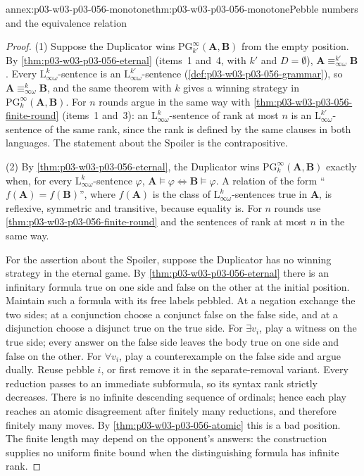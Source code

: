 \begin{annexitem}{annex:p03-w03-p03-056-monotone}{thm:p03-w03-p03-056-monotone}{Pebble numbers and the equivalence relation}
\begin{proof}
(1) Suppose the Duplicator wins \(\mathrm{PG}^\infty_{k'}(\mathbf A,\mathbf B)\)
from the empty position. By \cref{thm:p03-w03-p03-056-eternal} (items~1
and~4, with \(k'\) and \(D=\emptyset\)),
\(\mathbf A\equiv^{k'}_{\infty\omega}\mathbf B\). Every
\(\mathrm{L}^k_{\infty\omega}\)-sentence is an
\(\mathrm{L}^{k'}_{\infty\omega}\)-sentence
(\cref{def:p03-w03-p03-056-grammar}), so
\(\mathbf A\equiv^k_{\infty\omega}\mathbf B\), and the same theorem with
\(k\) gives a winning strategy in \(\mathrm{PG}^\infty_k(\mathbf A,\mathbf B)\).
For \(n\) rounds argue in the same way with
\cref{thm:p03-w03-p03-056-finite-round} (items~1 and~3): an
\(\mathrm{L}^k_{\infty\omega}\)-sentence of rank at most \(n\) is an
\(\mathrm{L}^{k'}_{\infty\omega}\)-sentence of the same rank, since the rank
is defined by the same clauses in both languages. The statement about the
Spoiler is the contrapositive.

(2) By \cref{thm:p03-w03-p03-056-eternal}, the Duplicator wins
\(\mathrm{PG}^\infty_k(\mathbf A,\mathbf B)\) exactly when, for every
\(\mathrm{L}^k_{\infty\omega}\)-sentence \(\varphi\),
\(\mathbf A\models\varphi\iff\mathbf B\models\varphi\). A relation of the
form ``\(f(\mathbf A)=f(\mathbf B)\)'', where \(f(\mathbf A)\) is the class
of \(\mathrm{L}^k_{\infty\omega}\)-sentences true in \(\mathbf A\), is
reflexive, symmetric and transitive, because equality is. For \(n\) rounds
use \cref{thm:p03-w03-p03-056-finite-round} and the sentences of rank at most
\(n\) in the same way.

For the assertion about the Spoiler, suppose the Duplicator has no winning
strategy in the eternal game. By \cref{thm:p03-w03-p03-056-eternal} there is
an infinitary formula true on one side and false on the other at the initial
position. Maintain such a formula with its free labels pebbled. At a
negation exchange the two sides; at a conjunction choose a conjunct false
on the false side, and at a disjunction choose a disjunct true on the true
side. For \(\exists v_i\), play a witness on the true side; every answer
on the false side leaves the body true on one side and false on the other.
For \(\forall v_i\), play a counterexample on the false side and argue
dually. Reuse pebble \(i\), or first remove it in the separate-removal
variant. Every reduction passes to an immediate subformula, so its syntax
rank strictly decreases. There is no infinite descending sequence of
ordinals; hence each play reaches an atomic disagreement after finitely
many reductions, and therefore finitely many moves. By
\cref{thm:p03-w03-p03-056-atomic} this is a bad position. The finite length
may depend on the opponent's answers: the construction supplies no uniform
finite bound when the distinguishing formula has infinite rank.
\end{proof}
\end{annexitem}

